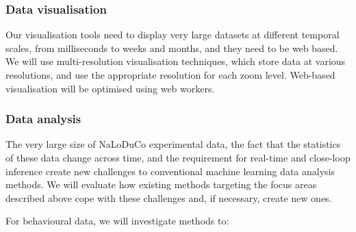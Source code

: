 \subsubsection{Data visualisation}

Our visualisation tools need to display very large datasets at different
temporal scales, from milliseconds to weeks and months, and they need to be web
based.
%
We will use multi-resolution visualisation techniques, which store data at
various resolutions, and use the appropriate resolution for each zoom level.
%
Web-based visualisation will be optimised using web workers.


%
%

\subsubsection{Data analysis}

The very large size of NaLoDuCo experimental data, the fact that the statistics
of these data change across time, and the requirement for real-time and
close-loop inference create new challenges to conventional machine learning
data analysis methods.
%
We will evaluate how existing methods targeting the focus areas described above
cope with these challenges and, if necessary, create new ones.

For behavioural data, we will investigate methods to:


